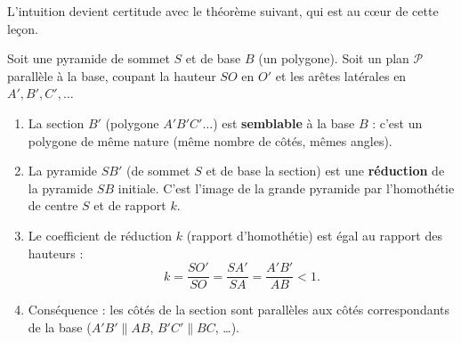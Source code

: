 \documentclass[11pt]{article}
\begin{document}
L'intuition devient certitude avec le théorème suivant, qui est au cœur de cette leçon.

\begin{propriete}
Soit une pyramide de sommet $S$ et de base $B$ (un polygone). Soit un plan $\mathcal{P}$ parallèle à la base, coupant la hauteur $SO$ en $O'$ et les arêtes latérales en $A', B', C', \dots$
\begin{enumerate}
    \item La section $B'$ (polygone $A'B'C'\dots$) est \textbf{semblable} à la base $B$ : c'est un polygone de même nature (même nombre de côtés, mêmes angles).
    \item La pyramide $SB'$ (de sommet $S$ et de base la section) est une \textbf{réduction} de la pyramide $SB$ initiale. C'est l'image de la grande pyramide par l'homothétie de centre $S$ et de rapport $k$.
    \item Le coefficient de réduction $k$ (rapport d'homothétie) est égal au rapport des hauteurs :
    \[
    k = \frac{SO'}{SO} = \frac{SA'}{SA} = \frac{A'B'}{AB} < 1.
    \]
    \item Conséquence : les côtés de la section sont parallèles aux côtés correspondants de la base ($A'B' \parallel AB$, $B'C' \parallel BC$, \dots).
\end{enumerate}
\end{propriete}
\end{document}
